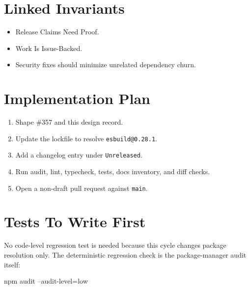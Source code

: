 \section{Linked Invariants}\label{record-215-linked-invariants}

\begin{itemize}
\tightlist
\item
  Release Claims Need Proof.
\item
  Work Is Issue-Backed.
\item
  Security fixes should minimize unrelated dependency churn.
\end{itemize}

\section{Implementation Plan}\label{record-215-implementation-plan}

\begin{enumerate}
\def\labelenumi{\arabic{enumi}.}
\tightlist
\item
  Shape \#357 and this design record.
\item
  Update the lockfile to resolve \texttt{e\allowbreak{}s\allowbreak{}b\allowbreak{}u\allowbreak{}i\allowbreak{}l\allowbreak{}d\allowbreak{}@\allowbreak{}0\allowbreak{}.\allowbreak{}2\allowbreak{}8\allowbreak{}.\allowbreak{}1}.
\item
  Add a changelog entry under \texttt{U\allowbreak{}n\allowbreak{}r\allowbreak{}e\allowbreak{}l\allowbreak{}e\allowbreak{}a\allowbreak{}s\allowbreak{}e\allowbreak{}d}.
\item
  Run audit, lint, typecheck, tests, docs inventory, and diff checks.
\item
  Open a non-draft pull request against \texttt{m\allowbreak{}a\allowbreak{}i\allowbreak{}n}.
\end{enumerate}

\section{Tests To Write First}\label{record-215-tests-to-write-first}

No code-level regression test is needed because this cycle changes package resolution only. The deterministic regression check is the package-manager audit itself:

\begin{CodeBlock}
npm audit --audit-level=low
\end{CodeBlock}

